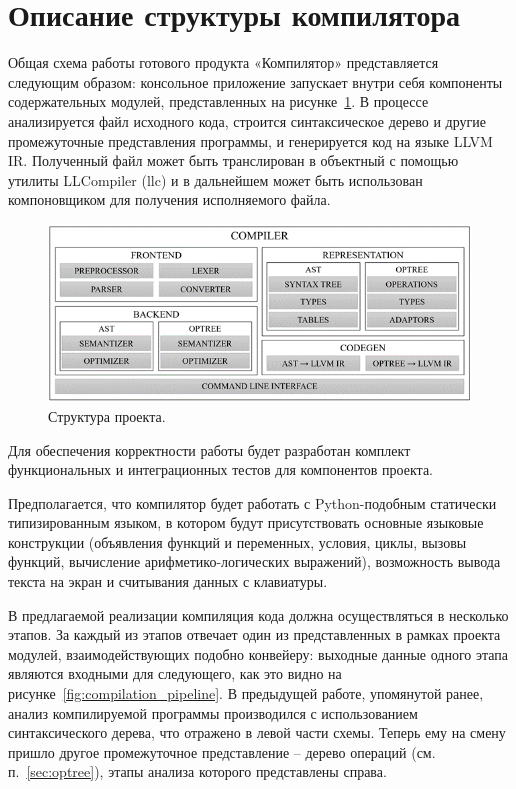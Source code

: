 \newpage
\section{Описание структуры компилятора}
\label{sec:project_structure}

Общая схема работы готового продукта «Компилятор» представляется следующим образом: консольное приложение запускает внутри себя компоненты содержательных модулей, представленных на рисунке~\ref{fig:project_structure}.
В процессе анализируется файл исходного кода, строится синтаксическое дерево и другие промежуточные представления программы, и генерируется код на языке LLVM IR.
Полученный файл может быть транслирован в объектный с помощью утилиты LLCompiler (llc) и в дальнейшем может быть использован компоновщиком для получения исполняемого файла.

\begin{figure}[h]
    \centering
    \includegraphics[width=\textwidth]{images/project-structure.png}
    \caption{Структура проекта.}
    \label{fig:project_structure}
\end{figure}

Для обеспечения корректности работы будет разработан комплект функциональных и интеграционных тестов для компонентов проекта.

Предполагается, что компилятор будет работать с Python-подобным статически типизированным языком, в котором будут присутствовать основные языковые конструкции (объявления функций и переменных, условия, циклы, вызовы функций, вычисление арифметико-логических выражений), возможность вывода текста на экран и считывания данных с клавиатуры.

В предлагаемой реализации компиляция кода должна осуществляться в несколько этапов.
За каждый из этапов отвечает один из представленных в рамках проекта модулей, взаимодействующих подобно конвейеру: выходные данные одного этапа являются входными для следующего, как это видно на рисунке~\ref{fig:compilation_pipeline}.
В предыдущей работе, упомянутой ранее, анализ компилируемой программы производился с использованием синтаксического дерева, что отражено в левой части схемы.
Теперь ему на смену пришло другое промежуточное представление -- дерево операций (см. п.~\ref{sec:optree}), этапы анализа которого представлены справа.

